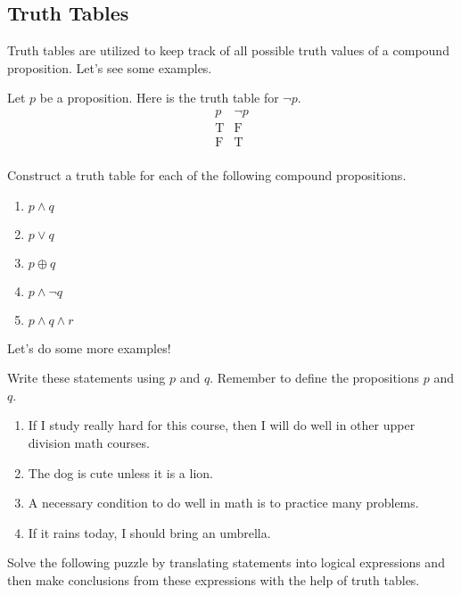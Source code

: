 \documentclass[../main.tex]{subfiles}
\begin{document}
\subsection{Truth Tables} 
Truth tables are utilized to keep track of all possible truth values of a compound proposition. Let's see some examples.
\begin{example}
    Let $p$ be a proposition. Here is the truth table for $\lnot p$.
    \[\begin{array}{ c|c }
        p & \neg p\\\hline
        \text{T} & \text{F} \\
        \text{F} & \text{T} \\
    \end{array}\]
\end{example}
\begin{exercise}
    Construct a truth table for each of the following compound propositions.
    \begin{enumerate}[label=(\alph*)]
        \item $p \land q$
        \item $p \lor q$
        \item $p \oplus q$
        \item $p \land \neg q$
        \item $p \land q \land r$
    \end{enumerate}
\end{exercise}
Let's do some more examples! 
\begin{exercise}
    Write these statements using $p$ and $q$. Remember to define the propositions $p$ and $q$.
    \begin{enumerate}[label=(\alph*)]
        \item If I study really hard for this course, then I will do well in other upper division math courses. 
        \item The dog is cute unless it is a lion. 
        \item A necessary condition to do well in math is to practice many problems.
        \item If it rains today, I should bring an umbrella. 
    \end{enumerate}
\end{exercise}
Solve the following puzzle by translating statements into logical expressions and then make conclusions from these expressions with the help of truth tables.
\end{document}
